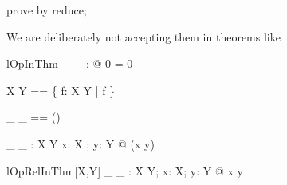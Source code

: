 \begin{zproof}[S\$domainCheck]
prove by reduce;
\end{zproof}

We are deliberately not accepting them in theorems like
\begin{theorem}{lOpInThm}
  \forall \_ \middle \_ : \nat \cross \nat \fun \nat @ 0  = 0
\end{theorem}

\begin{zed}
   X \zevesgen Y == \{ f: X \fun Y | f \neq \emptyset \}
\end{zed}

\begin{zed}
   \_ \zevesgenother \_ == (\nat \cross \nat) \rel \nat
\end{zed}


\begin{gendef}[X, Y]
   \_ \zevesrel \_ : X \rel Y
\where
   \forall x: X ; y: Y @ (x \zevesrel y)
\end{gendef}

\begin{theorem}{lOpRelInThm}[X,Y]
   \forall \_ \zevesthmrel \_ : X \rel Y; x: X; y: Y @ x \zevesthmrel y
\end{theorem}
